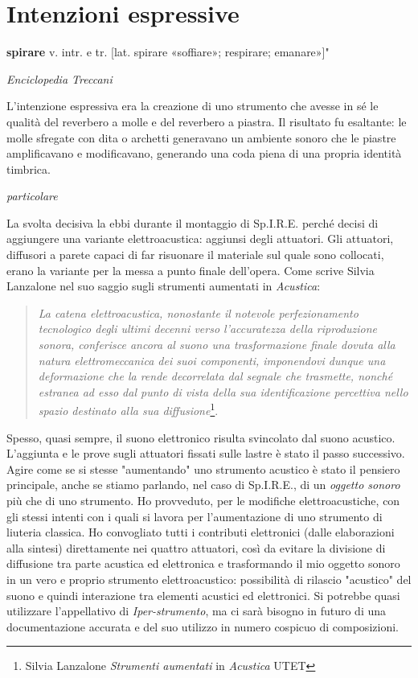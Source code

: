 \section{Intenzioni espressive}

\epigraph{\textbf{spirare} v. intr. e tr. [lat. spirare «soffiare»; respirare; emanare»]"}
{\textit{Enciclopedia Treccani}}

L'intenzione espressiva era la creazione di uno strumento che avesse in sé le qualità del reverbero a molle e del reverbero a piastra. Il risultato fu esaltante: le molle sfregate con dita o archetti generavano un ambiente sonoro che le piastre amplificavano e modificavano, generando una coda piena di una propria identità timbrica.
\begin{floatingfigure}{10cm}
\mbox{}
\small{\caption{\textit{particolare}}}
\end{floatingfigure}
La svolta decisiva la ebbi durante il montaggio di Sp.I.R.E. perché decisi di aggiungere una variante elettroacustica: aggiunsi degli attuatori. Gli attuatori, diffusori a parete capaci di far risuonare il materiale sul quale sono collocati, erano la variante per la messa a punto finale dell'opera.
Come scrive Silvia Lanzalone nel suo saggio sugli strumenti aumentati in \textit{Acustica}:
\begin{quotation}
\textit{La catena elettroacustica, nonostante il notevole perfezionamento tecnologico degli ultimi decenni verso l'accuratezza della riproduzione sonora, conferisce ancora al suono una trasformazione finale dovuta alla natura elettromeccanica dei suoi componenti, imponendovi dunque una deformazione che la rende decorrelata dal segnale che trasmette, nonché estranea ad esso dal punto di vista della sua identificazione percettiva nello spazio destinato alla sua diffusione}\footnote{Silvia Lanzalone \textit{Strumenti aumentati} in \textit{Acustica} UTET}.
\end{quotation}

Spesso, quasi sempre, il suono elettronico risulta svincolato dal suono acustico. L'aggiunta e le prove sugli attuatori fissati sulle lastre è stato il passo successivo. Agire come se si stesse "aumentando" uno strumento acustico è stato il pensiero principale, anche se stiamo parlando, nel caso di Sp.I.R.E., di un \textit{oggetto sonoro} più che di uno strumento. Ho provveduto, per le modifiche elettroacustiche, con gli stessi intenti con i quali si lavora per l'aumentazione di uno strumento di liuteria classica. Ho convogliato tutti i contributi elettronici (dalle elaborazioni alla sintesi) direttamente nei quattro attuatori, così da evitare la divisione di diffusione tra parte acustica ed elettronica e trasformando il mio oggetto sonoro in un vero e proprio strumento elettroacustico: possibilità di rilascio "acustico" del suono e quindi interazione tra elementi acustici ed elettronici. Si potrebbe quasi utilizzare l'appellativo di \textit{Iper-strumento}, ma ci sarà bisogno in futuro di una documentazione accurata e del suo utilizzo in numero cospicuo di composizioni. 

